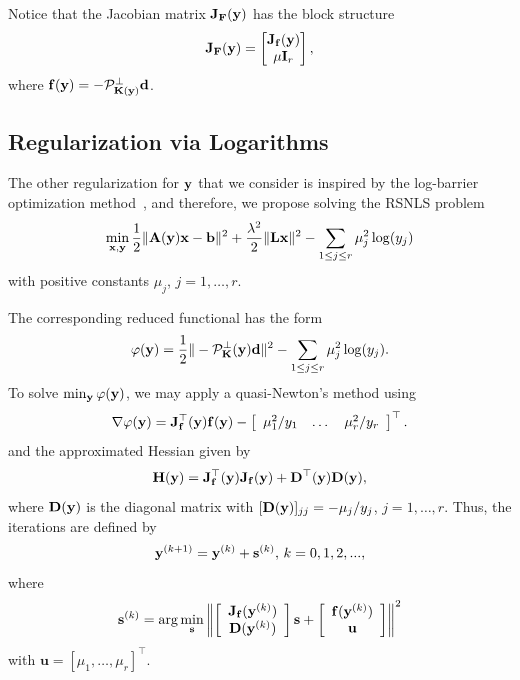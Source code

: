 \documentclass[onefignum,onetabnum]{siamart171218}
\newcommand{\bA}{{\bf A}}
\newcommand{\bD}{{\bf D}}
\newcommand{\bF}{{\bf F}}
\newcommand{\bH}{{\bf H}}
\newcommand{\bJ}{{\bf J}}
\newcommand{\bK}{{\bf K}}
\newcommand{\bL}{{\bf L}}
\newcommand{\bb}{{\bf b}}
\newcommand{\bd}{{\bf d}}
\newcommand{\bff}{{\bf f}}
\newcommand{\bs}{{\bf s}}
\newcommand{\bx}{{\bf x}}
\newcommand{\by}{{\bf y}}
\newcommand{\calP}{\mathcal{P}}
\begin{document}
Notice that the Jacobian matrix $\bJ_{\bF}(\by)$ has the block structure
\begin{equation*}
\bJ_{\bF}(\by) = 
\begin{bmatrix}
\bJ_{\bff}(\by) \\
\mu \mathbf{I}_r
\end{bmatrix},
\end{equation*}
where $\bff(\by)= - \mathcal{P}_{\bK(\by)}^\perp \bd$.

\subsection{Regularization via Logarithms}\label{subsec:log}
The other regularization for $\by$ that we consider is inspired by the log-barrier optimization method~\cite{nocedal2006numerical}, and therefore, we propose solving the RSNLS problem
\begin{equation*}
    \min_{\bx, \by} \frac{1}{2}\| \bA(\by) \bx - \bb \|^2 + \frac{\lambda^2}{2} \| \bL \bx\|^2 - \sum_{1\le j \le r}\mu_j^2 \log(y_j)\end{equation*} 
with positive constants $\mu_j$, $j=1,\dots, r$.

The corresponding reduced functional has the form
\[ \varphi(\by) = \dfrac{1}{2}\| - \calP_{\bK}^\perp(\by) \bd \|^2 - \sum_{1\le j \le r}\mu_j^2 \log(y_j). \]
To solve $\min_{\by} \varphi(\by)$, we may apply a quasi-Newton's method using
\[ \nabla \varphi(\by) = \bJ^\top_{\mathbf{f}}(\by) \mathbf{f}(\by)-\left[\begin{array}{cccc} \mu_1^2/y_1 & \dots & \mu_r^2/y_r   \end{array} \right]^\top.\]
and the approximated Hessian given by
\[ \bH(\by) = \bJ^\top_{\mathbf{f}}(\by) \bJ_{\mathbf{f}}(\by) + \bD^\top(\by) \bD(\by), \]
where $\bD(\by)$ is the diagonal matrix with  $[\bD(\by)]_{jj} = -\mu_j / y_j$, $j=1,\dots, r$.
Thus, the iterations are defined by 
$$
\by^{(k+1)} = \by^{(k)} + \bs^{(k)}, \,k = 0,1,2,...,
$$
where
\begin{equation*}
\bs^{(k)} = \arg\min_{\bs} \left\| \left[\begin{array}{c}\bJ_{\bff}(\by^{(k)}) \\ \bD(\by^{(k)})\end{array}\right]\bs + \left[\begin{array}{c} \bff(\by^{(k)}) \\ \mathbf{u}\end{array} \right] \right\|^2
\end{equation*}
with $\mathbf{u}= [\mu_1, \dots, \mu_r]^\top$.
\end{document}
